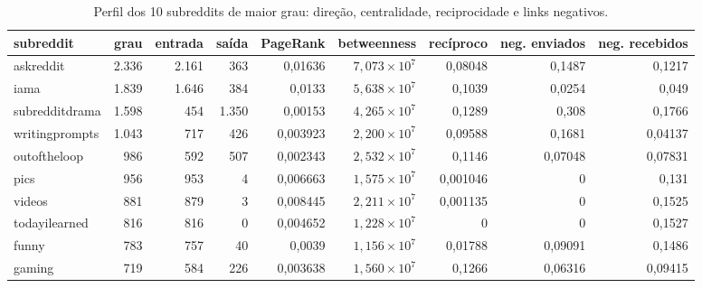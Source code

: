 \begin{table}[htbp]
\centering
\small
\caption{Perfil dos 10 subreddits de maior grau: direção, centralidade, reciprocidade e links negativos.}
\label{tab:08_perfil_hubs}
\begin{tabular}{lrrrrrrrr}
\toprule
subreddit & grau & entrada & saída & PageRank & betweenness & recíproco & neg. enviados & neg. recebidos \\
\midrule
askreddit & 2.336 & 2.161 & 363 & 0,01636 & $7,073 \times 10^{7}$ & 0,08048 & 0,1487 & 0,1217 \\
iama & 1.839 & 1.646 & 384 & 0,0133 & $5,638 \times 10^{7}$ & 0,1039 & 0,0254 & 0,049 \\
subredditdrama & 1.598 & 454 & 1.350 & 0,00153 & $4,265 \times 10^{7}$ & 0,1289 & 0,308 & 0,1766 \\
writingprompts & 1.043 & 717 & 426 & 0,003923 & $2,200 \times 10^{7}$ & 0,09588 & 0,1681 & 0,04137 \\
outoftheloop & 986 & 592 & 507 & 0,002343 & $2,532 \times 10^{7}$ & 0,1146 & 0,07048 & 0,07831 \\
pics & 956 & 953 & 4 & 0,006663 & $1,575 \times 10^{7}$ & 0,001046 & 0 & 0,131 \\
videos & 881 & 879 & 3 & 0,008445 & $2,211 \times 10^{7}$ & 0,001135 & 0 & 0,1525 \\
todayilearned & 816 & 816 & 0 & 0,004652 & $1,228 \times 10^{7}$ & 0 & 0 & 0,1527 \\
funny & 783 & 757 & 40 & 0,0039 & $1,156 \times 10^{7}$ & 0,01788 & 0,09091 & 0,1486 \\
gaming & 719 & 584 & 226 & 0,003638 & $1,560 \times 10^{7}$ & 0,1266 & 0,06316 & 0,09415 \\
\bottomrule
\end{tabular}
\end{table}
